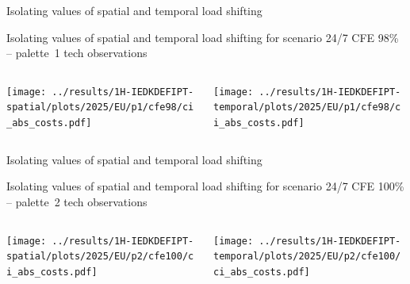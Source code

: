 \begin{frame}{Isolating values of spatial and temporal load shifting}

  {\footnotesize
  Isolating values of spatial and temporal load shifting for scenario 24/7 CFE 98\% -- palette~1 tech
  \newline
  observations
  \newline

  \begin{columns}
    \begin{column}{7.5cm}
    \texttt{[image: ../results/1H-IEDKDEFIPT-spatial/plots/2025/EU/p1/cfe98/ci\_abs\_costs.pdf]}
    \end{column}
    
    \begin{column}{7.5cm}
    \texttt{[image: ../results/1H-IEDKDEFIPT-temporal/plots/2025/EU/p1/cfe98/ci\_abs\_costs.pdf]}
    \end{column}
  \end{columns}

  }
  
\end{frame}


\begin{frame}{Isolating values of spatial and temporal load shifting}

  {\footnotesize
  Isolating values of spatial and temporal load shifting for scenario 24/7 CFE 100\% -- palette~2 tech
  \newline
  observations
  \newline

  \begin{columns}
    \begin{column}{7.5cm}
    \texttt{[image: ../results/1H-IEDKDEFIPT-spatial/plots/2025/EU/p2/cfe100/ci\_abs\_costs.pdf]}
    \end{column}
    
    \begin{column}{7.5cm}
    \texttt{[image: ../results/1H-IEDKDEFIPT-temporal/plots/2025/EU/p2/cfe100/ci\_abs\_costs.pdf]}
    \end{column}
  \end{columns}

  }
  
\end{frame}




